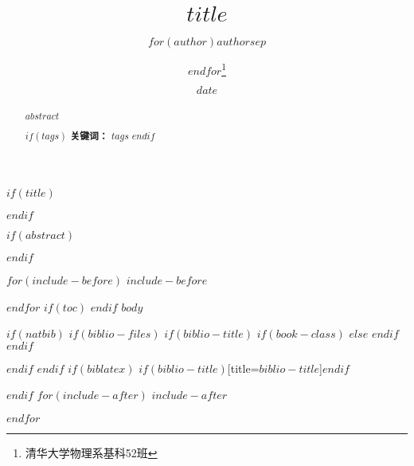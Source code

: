 \documentclass[12pt,a4paper]{ctexart}
\title{$title$}
\author{$for(author)$$author$$sep$ \and $endfor$\thanks{清华大学物理系\quad 基科52班 \quad 2015012206} }
\date{$date$}
\begin{document}
$if(title)$
\maketitle
$endif$


$if(abstract)$

\begin{abstract}
$abstract$

$if(tags)$
\textbf{关键词：} $tags$
$endif$
\end{abstract}
$endif$



\tableofcontents
$for(include-before)$
$include-before$

$endfor$
$if(toc)$
{
\hypersetup{linkcolor=black}
\setcounter{tocdepth}{$toc-depth$}
\tableofcontents
}
$endif$
$body$

$if(natbib)$
$if(biblio-files)$
$if(biblio-title)$
$if(book-class)$
\renewcommand\bibname{$biblio-title$}
$else$
\renewcommand\refname{$biblio-title$}
$endif$
$endif$


$endif$
$endif$
$if(biblatex)$
\printbibliography$if(biblio-title)$[title=$biblio-title$]$endif$

$endif$
$for(include-after)$
$include-after$

$endfor$
\end{document}
